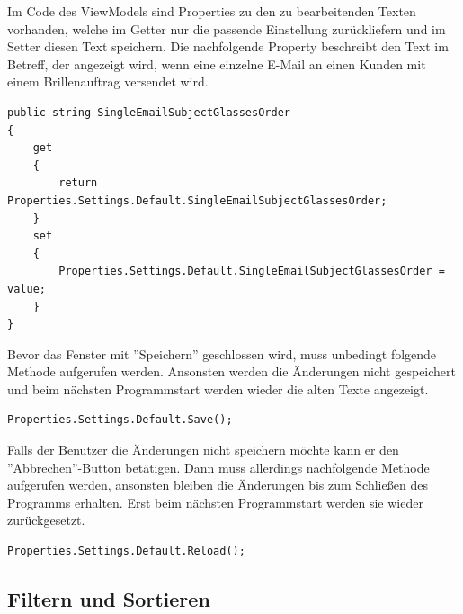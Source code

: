 \newline Im Code des ViewModels sind Properties zu den zu bearbeitenden Texten vorhanden, welche im Getter nur die passende Einstellung zurückliefern und im Setter diesen Text speichern. \newline Die nachfolgende Property beschreibt den Text im Betreff, der angezeigt wird, wenn eine einzelne E-Mail an einen Kunden mit einem Brillenauftrag versendet wird.
\begin{lstlisting}
public string SingleEmailSubjectGlassesOrder 
{
	get 
	{ 
		return Properties.Settings.Default.SingleEmailSubjectGlassesOrder; 
	} 
	set 
	{ 
		Properties.Settings.Default.SingleEmailSubjectGlassesOrder = value; 
	} 
}
\end{lstlisting}
Bevor das Fenster mit ''Speichern'' geschlossen wird, muss unbedingt folgende Methode aufgerufen werden. Ansonsten werden die Änderungen nicht gespeichert und beim nächsten Programmstart werden wieder die alten Texte angezeigt.
\begin{lstlisting}
Properties.Settings.Default.Save();
\end{lstlisting}
Falls der Benutzer die Änderungen nicht speichern möchte kann er den ''Abbrechen''-Button betätigen. Dann muss allerdings nachfolgende Methode aufgerufen werden, ansonsten bleiben die Änderungen bis zum Schließen des Programms erhalten. Erst beim nächsten Programmstart werden sie wieder zurückgesetzt.
\begin{lstlisting}
Properties.Settings.Default.Reload();
\end{lstlisting}
\subsection{Filtern und Sortieren}
